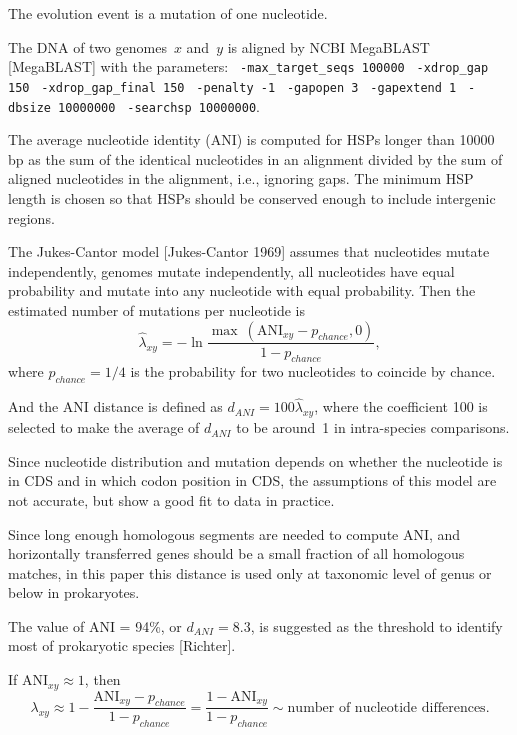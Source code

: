\documentclass[10pt,a4paper]{article}
\begin{document}

The evolution event is a mutation of one nucleotide.

The DNA of two genomes~$x$ and~$y$ is aligned by NCBI MegaBLAST [MegaBLAST] with the parameters:
\verb| -max_target_seqs 100000|
\verb| -xdrop_gap 150|
\verb| -xdrop_gap_final 150|
\verb| -penalty -1|
\verb| -gapopen 3|
\verb| -gapextend 1|
\verb| -dbsize 10000000|
\verb| -searchsp 10000000|.

The average nucleotide identity (ANI) is computed for HSPs longer than 10000 bp as the sum of the identical nucleotides in an alignment divided by the sum of aligned nucleotides in the alignment,
i.e., ignoring gaps.
The minimum HSP length is chosen so that HSPs should be conserved enough to include intergenic regions.

The Jukes-Cantor model [Jukes-Cantor 1969] assumes that nucleotides mutate independently, genomes mutate independently, all nucleotides have equal probability and mutate into any nucleotide with equal probability.
Then the estimated number of mutations per nucleotide is
$$ \hat \lambda_{xy} = - \ln \frac {\max \ (\mathrm{ANI}_{xy} - p_{chance}, 0)} {1 - p_{chance}}, $$
where $p_{chance} = 1/4$ is the probability for two nucleotides to coincide by chance.

And the ANI distance is defined as
$ d_{ANI} = 100 \hat \lambda_{xy}$,
where the coefficient 100 is selected to make the average of $d_{ANI}$ to be around~1 in intra-species comparisons.

Since nucleotide distribution and mutation depends on whether the nucleotide is in CDS and in which codon position in CDS,
the assumptions of this model are not accurate, but show a good fit to data in practice.

Since long enough homologous segments are needed to compute ANI,
and horizontally transferred genes should be a small fraction of all homologous matches,
in this paper this distance is used only at taxonomic level of genus or below in prokaryotes.

The value of ANI = 94\%, or $d_{ANI} = 8.3$, is suggested as the threshold to identify most of prokaryotic species [Richter].

If $\mathrm{ANI}_{xy} \approx 1$, then
$$ \lambda_{xy} \approx 1 - \frac {\mathrm{ANI}_{xy} - p_{chance}} {1 - p_{chance}} = \frac {1 - \mathrm{ANI}_{xy}}  {1 - p_{chance}}
  \sim \textrm{number of nucleotide differences}.
$$


\end{document}
